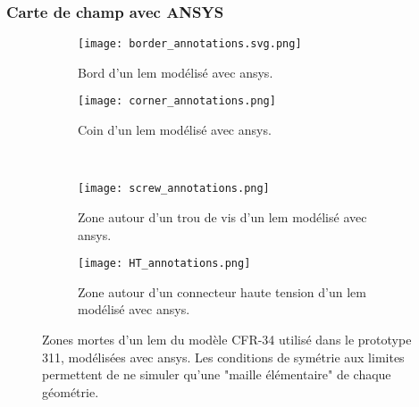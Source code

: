             \subsubsection{Carte de champ avec ANSYS}
                
                \begin{figure}[htbp]
                    \begin{subfigure}[t]{0.48\textwidth}
                        \texttt{[image: border\_annotations.svg.png]}
                        \caption[Bord d'un \gls{lem} modélisé avec \gls{ansys}.]{Bord d'un \gls{lem} modélisé avec \gls{ansys}.}
                        \label{fig::lem_border}
                    \end{subfigure}
                    \hfill
                    \begin{subfigure}[t]{0.48\textwidth}
                        \texttt{[image: corner\_annotations.png]}
                        \caption[Coin d'un \gls{lem} modélisé avec \gls{ansys}.]{Coin d'un \gls{lem} modélisé avec \gls{ansys}.}
                        \label{fig::corner}
                    \end{subfigure}\\
                    \begin{subfigure}[b]{0.48\textwidth}
                        \texttt{[image: screw\_annotations.png]}
                        \caption[Zone autour d'un trou de vis d'un \gls{lem} modélisé avec \gls{ansys}.]{Zone autour d'un trou de vis d'un \gls{lem} modélisé avec \gls{ansys}.}
                        \label{fig::screw}
                    \end{subfigure}
                    \hfill
                    \begin{subfigure}[b]{0.48\textwidth}
                        \texttt{[image: HT\_annotations.png]}
                        \caption[Zone autour d'un connecteur haute tension d'un \gls{lem} modélisé avec \gls{ansys}.]{Zone autour d'un connecteur haute tension d'un \gls{lem} modélisé avec \gls{ansys}.}
                        \label{fig::HT}
                    \end{subfigure}
                    \caption[Zones mortes d'un \gls{lem} modélisé avec \gls{ansys}.]{Zones mortes d'un \gls{lem} du modèle CFR-34 utilisé dans le prototype 311, modélisées avec \gls{ansys}. Les conditions de symétrie aux limites permettent de ne simuler qu'une "maille élémentaire" de chaque géométrie.}
                    \label{fig::zones_mortes}
                \end{figure}
            
